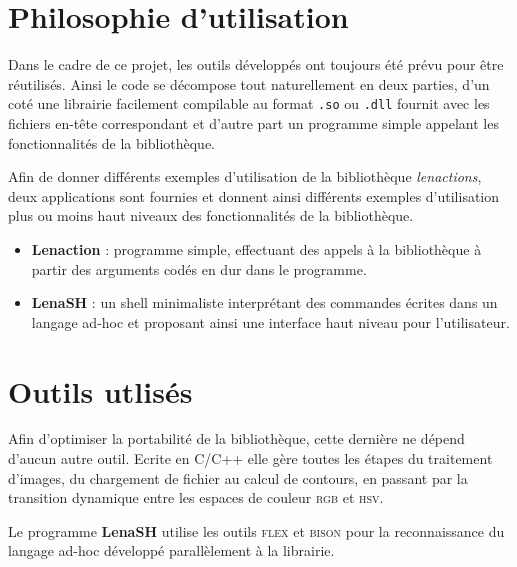 
\usepackage{subfigure}
\usepackage{hyperref}
\usepackage{draftwatermark}


\maketitle

\section{Philosophie d'utilisation}
Dans le cadre de ce projet, les outils développés ont toujours été prévu pour être réutilisés. Ainsi le code se décompose tout naturellement en deux parties, d'un coté une librairie facilement compilable au format \texttt{.so} ou \texttt{.dll} fournit avec les fichiers en-tête correspondant et d'autre part un programme simple appelant les fonctionnalités de la bibliothèque.

Afin de donner différents exemples d'utilisation de la bibliothèque \emph{lenactions}, deux applications sont fournies et donnent ainsi différents exemples d'utilisation plus ou moins haut niveaux des fonctionnalités de la bibliothèque.
\begin{itemize}
	\item \textbf{Lenaction} : programme simple, effectuant des appels à la bibliothèque à partir des arguments codés en dur dans le programme.
	\item \textbf{LenaSH} : un shell minimaliste interprétant des commandes écrites dans un langage ad-hoc et proposant ainsi une interface haut niveau pour l'utilisateur.
\end{itemize}

\section{Outils utlisés}
Afin d'optimiser la portabilité de la bibliothèque, cette dernière ne dépend d'aucun autre outil. Ecrite en C/C++ elle gère toutes les étapes du traitement d'images, du chargement de fichier au calcul de contours, en passant par la transition dynamique entre les espaces de couleur \textsc{rgb} et \textsc{hsv}.

Le programme \textbf{LenaSH} utilise les outils \textsc{flex} et \textsc{bison} pour la reconnaissance du langage ad-hoc développé parallèlement à la librairie.

